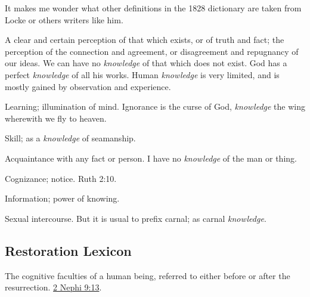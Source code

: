 	It makes me wonder what other definitions in the 1828 dictionary are taken from Locke or others writers like him.

	\begin{compactitem}
		\item[1] A clear and certain perception of that which exists, or of truth and fact; the perception of the connection and agreement, or disagreement and repugnancy of our ideas. We can have no \textit{knowledge} of that which does not exist. God has a perfect \textit{knowledge} of all his works. Human \textit{knowledge} is very limited, and is mostly gained by observation and experience.
		\item[2] Learning; illumination of mind. Ignorance is the curse of God, \textit{knowledge} the wing wherewith we fly to heaven. 
		\item[3] Skill; as a \textit{knowledge} of seamanship.
		\item[4] Acquaintance with any fact or person. I have no \textit{knowledge} of the man or thing.
		\item[5] Cognizance; notice. Ruth 2:10.
		\item[6] Information; power of knowing.
		\item[7] Sexual intercourse. But it is usual to prefix carnal; as carnal \textit{knowledge}.
	\end{compactitem}


	
\subsection{Restoration Lexicon} %
	\label{KNOWLEDGE-OED}

	\begin{compactitem}
		\item The cognitive faculties of a human being, referred to either before or after the resurrection. \hyperref[2NEPHI-9-13]{2 Nephi 9:13}.
	\end{compactitem}

